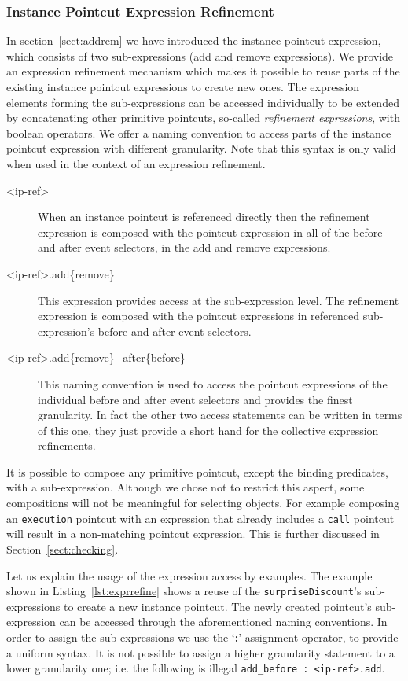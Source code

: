 \documentclass[10pt]{sigplanconf}
\newcommand{\lstinln}[1]{\lstinline~#1~}
\begin{document}
\subsubsection{Instance Pointcut Expression Refinement}
In section~\ref{sect:addrem} we have introduced the instance pointcut expression, which consists of two sub-expressions (add and remove expressions).
We provide an expression refinement mechanism which makes it possible to reuse parts of the existing instance pointcut expressions to create new ones.
The expression elements forming the sub-expressions can be accessed individually to be extended by concatenating other primitive pointcuts, so-called \emph{refinement expressions}, with boolean operators.
We offer a naming convention to access parts of the instance pointcut expression with different granularity. Note that this syntax is only valid when used in the context of an expression refinement.
\begin{description}
\item[<ip-ref>]When an instance pointcut is referenced directly then the refinement expression is composed with the pointcut expression in all of the before and after event selectors, in the add and remove expressions.
\item[<ip-ref>.add\{remove\}] This expression provides access at the sub-expression level. The refinement expression is composed with the pointcut expressions in referenced sub-expression's before and after event selectors.
\item[<ip-ref>.add\{remove\}_after\{before\}] This naming convention is used to access the pointcut expressions of the individual before and after event selectors and provides the finest granularity. In fact the other two access statements can be written in terms of this one, they just provide a short hand for the collective expression refinements.
\end{description}

It is possible to compose any primitive pointcut, except the binding predicates, with a sub-expression. Although we chose not to restrict this aspect, some compositions will not be meaningful for selecting objects. For example composing an \lstinln{execution} pointcut with an expression that already includes a \lstinln{call} pointcut will result in a non-matching pointcut expression. This is further discussed in Section~\ref{sect:checking}.

Let us explain the usage of the expression access by examples. The example shown in Listing~\ref{lst:exprrefine} shows a reuse of the \lstinln{surpriseDiscount}'s sub-expressions to create a new instance pointcut. The newly created pointcut's sub-expression can be accessed through the aforementioned naming conventions. In order to assign the sub-expressions we use the `\textbf{\textsf{:}}' assignment operator, to provide a uniform syntax.  It is not possible to assign a higher granularity statement to a lower granularity one; i.e. the following is illegal \lstinln{add_before : <ip-ref>.add}.
\end{document}
